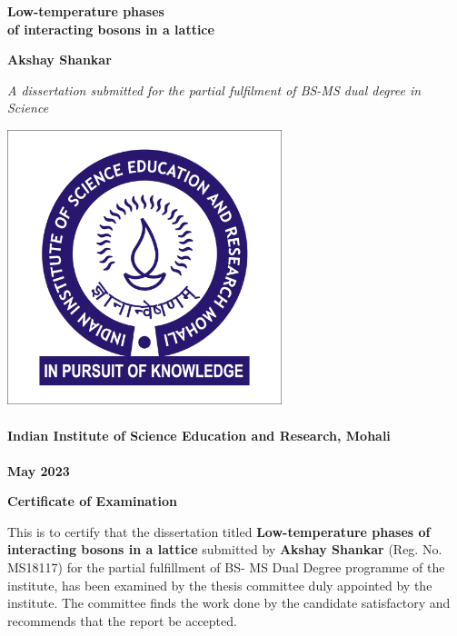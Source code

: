 \documentclass[titlepage]{report}
\begin{document}
\begin{titlepage}

  \begin{center}
    \LARGE
    \textbf{Low-temperature phases \\ of interacting bosons in a lattice}

    \vspace{1cm}
    \Large
    \textbf{Akshay Shankar}
    \vspace{1cm}
    
    \large
    \textit{A dissertation submitted for the partial fulfilment of
    BS-MS dual degree in Science}
    
    \vspace{3.5cm}

    \includegraphics[width=8cm]{IISERLogo.jpg}~\\~\\
    \large
    \textbf{Indian Institute of Science Education and Research, Mohali}~\\~\\
    \large
    \textbf{May 2023}
\end{center}
\end{titlepage}
\clearpage

\begin{center}
  \textbf{\Large Certificate of Examination}
\end{center}

This is to certify that the dissertation titled \textbf{Low-temperature phases
of interacting bosons in a lattice} submitted by \textbf{Akshay Shankar} (Reg. No. MS18117) for the partial fulfillment of BS- MS Dual Degree programme of the institute, has been examined by the thesis committee duly appointed by the institute. The committee finds the work done by the candidate satisfactory and recommends that the report be accepted.
\end{document}
